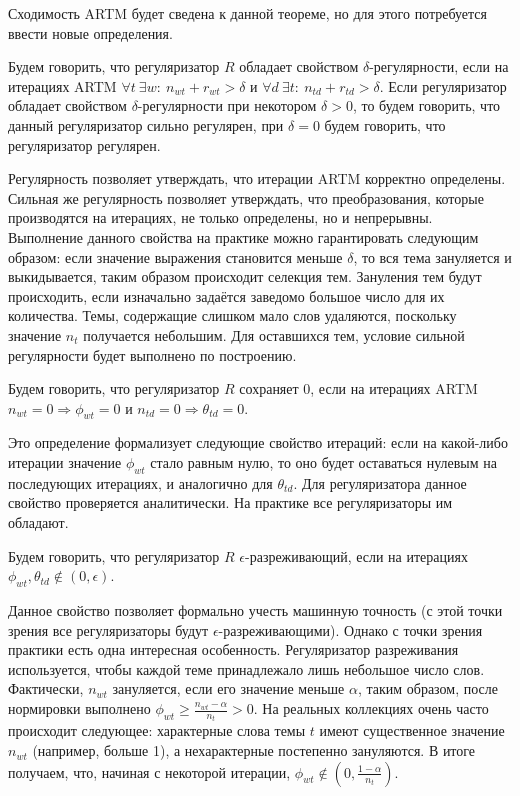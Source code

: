 \documentclass[12pt, twoside]{article}
\begin{document}
Сходимость ARTM будет сведена к данной теореме, но для этого потребуется ввести новые определения.

\begin{Definition}
\label{strongreg}
Будем говорить, что регуляризатор $ R$ обладает свойством $\delta$-регулярности, если на итерациях ARTM $\forall t~\exists w \colon~n_{wt} + r_{wt} > \delta$ и $\forall d~\exists t \colon~n_{td} + r_{td} > \delta$. Если регуляризатор  обладает свойством $\delta$-регулярности при некотором $\delta > 0$, то будем говорить, что данный регуляризатор сильно регулярен, при $\delta=0$ будем говорить, что регуляризатор регулярен.
\end{Definition}

 Регулярность позволяет утверждать, что итерации ARTM корректно определены. Сильная же регулярность позволяет утверждать, что преобразования, которые производятся на итерациях, не только определены, но и непрерывны. Выполнение данного свойства на практике  можно гарантировать следующим образом: если значение выражения становится меньше $\delta$, то вся тема зануляется  и выкидывается, таким образом происходит селекция тем. Зануления тем будут происходить, если  изначально задаётся заведомо большое число для их количества. Темы, содержащие слишком мало слов удаляются, поскольку значение $n_t$ получается небольшим. Для оставшихся тем, условие сильной регулярности будет выполнено по построению.
 
\begin{Definition}
Будем говорить, что регуляризатор $R$ сохраняет 0, если на итерациях ARTM $n_{wt} = 0 \Rightarrow \phi_{wt} = 0$ и $n_{td} = 0 \Rightarrow \theta_{td} = 0$.
\end{Definition}

Это определение формализует следующие свойство итераций: если на какой-либо итерации значение $\phi_{wt}$ стало равным нулю, то оно будет оставаться нулевым на последующих итерациях, и аналогично для $\theta_{td}$. Для регуляризатора данное свойство проверяется аналитически. На практике все регуляризаторы им обладают.

\begin{Definition}
\label{sparsereg}
Будем говорить, что регуляризатор $ R$ $\epsilon$-разреживающий, если на итерациях $\phi_{wt}, \theta_{td} \notin (0, \epsilon)$.
\end{Definition}

Данное свойство позволяет формально учесть машинную точность (с этой точки зрения все регуляризаторы будут $\epsilon$-разреживающими). Однако с точки зрения практики есть одна интересная особенность. Регуляризатор разреживания используется, чтобы каждой теме принадлежало лишь небольшое число слов. Фактически,  $n_{wt}$ зануляется, если его значение меньше $\alpha$, таким образом, после нормировки выполнено $\phi_{wt} \geq \frac{n_{wt} - \alpha}{n_t} > 0$.  На реальных коллекциях очень часто происходит следующее: характерные слова темы $t$ имеют существенное значение $n_{wt}$ (например, больше 1), а нехарактерные постепенно зануляются. В итоге получаем, что, начиная с некоторой итерации, $\phi_{wt} \notin (0, \frac{1-\alpha}{n_t})$.
\end{document}

